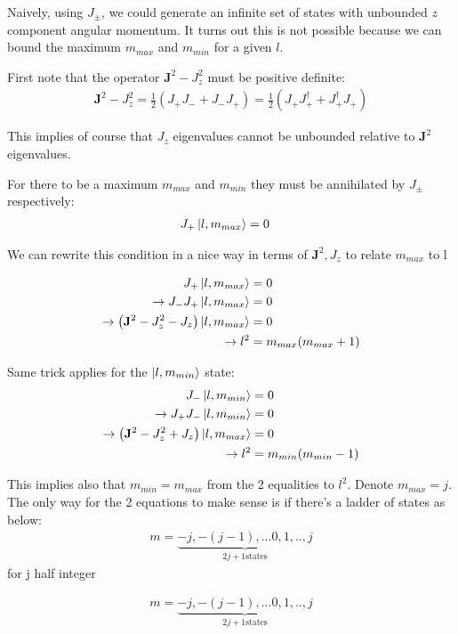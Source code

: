 \documentclass[12pt]{scrartcl}
\begin{document}
Naively, using $J_{\pm}$, we could generate an infinite set of states with unbounded $z$ component angular momentum.  It turns out this is not possible because we can bound the maximum $m_{max}$ and $m_{min}$ for a given $l$.  

First note that the operator $\mathbf{J}^2 - J_z^2$ must be positive definite:
\begin{align}
\mathbf{J}^2 - J_z^2 = \frac12 \left(J_+ J_- + J_- J_+ \right) =  \frac12 \left(J_+ J_+^\dagger + J_+^\dagger J_+ \right)
\end{align}

This implies of course that $J_z$ eigenvalues cannot be unbounded relative to $\mathbf{J}^2$ eigenvalues.

For there to be a maximum $m_{max}$ and $m_{min}$ they must be annihilated by $J_{\pm}$ respectively:\begin{align}
J_+ \ket{l, m_{max}} &= 0
\end{align}

We can rewrite this condition in a nice way in terms of $\mathbf{J}^2, J_z$ to relate $m_{max}$ to l

\begin{align}
J_+ \ket{l, m_{max}} &= 0 \\
\rightarrow J_- J_+ \ket{l, m_{max}} &= 0 \\
\rightarrow \left(\mathbf{J}^2 - J_z^2 - J_z \right) \ket{l, m_{max}} &= 0 \\
\rightarrow l^2 &= m_{max} (m_{max} +1) 
\end{align}

Same trick applies for the $\ket{l, m_{min}}$ state:
\begin{align}
J_- \ket{l, m_{min}} &= 0 \\
\rightarrow J_+ J_- \ket{l, m_{min}} &= 0 \\
\rightarrow \left(\mathbf{J}^2 - J_z^2 + J_z \right) \ket{l, m_{max}} &= 0 \\
\rightarrow l^2 &= m_{min} (m_{min} - 1) 
\end{align}

This implies also that $m_{min} = m_{max}$ from the 2 equalities to $l^2$.  Denote $m_{max} = j$. The only way for the 2 equations to make sense is if there's a ladder of states as below:
\begin{align}
m = \underbrace{-j, -(j-1), ... 0, 1, .., j}_{2j + 1 \text{states}}
\end{align}
for j half integer

\begin{align}
m = \underbrace{-j, -(j-1), ... 0, 1, .., j}_{2j + 1 \text{states}}
\end{align}
\end{document}

